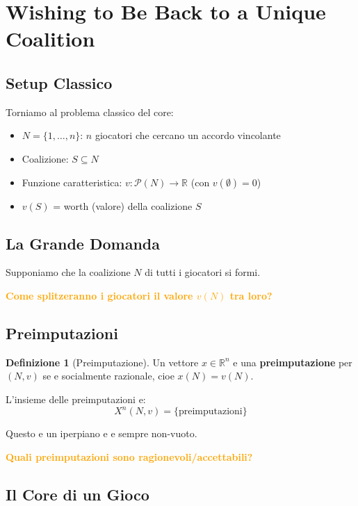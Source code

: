 \documentclass[12pt,a4paper]{article}
\theoremstyle{definition}
\newtheorem{definition}{Definizione}[section]
\begin{document}
\newpage

\section{Wishing to Be Back to a Unique Coalition}

\subsection*{Setup Classico}

Torniamo al problema classico del core:
\begin{itemize}
    \item $N = \{1, \ldots, n\}$: $n$ giocatori che cercano un accordo vincolante
    \item Coalizione: $S \subseteq N$
    \item Funzione caratteristica: $v : \mathcal{P}(N) \to \mathbb{R}$ (con $v(\emptyset) = 0$)
    \item $v(S)$ = worth (valore) della coalizione $S$
\end{itemize}

\subsection*{La Grande Domanda}

Supponiamo che la coalizione $N$ di tutti i giocatori si formi.

\textcolor{orange}{\textbf{Come splitzeranno i giocatori il valore $v(N)$ tra loro?}}

\subsection*{Preimputazioni}

\begin{definition}[Preimputazione]
Un vettore $x \in \mathbb{R}^n$ e una \textbf{preimputazione} per $(N, v)$ se e socialmente razionale, cioe $x(N) = v(N)$.
\end{definition}

L'insieme delle preimputazioni e:
\[
X^n(N, v) = \{\text{preimputazioni}\}
\]

Questo e un iperpiano e e sempre non-vuoto.

\textcolor{orange}{\textbf{Quali preimputazioni sono ragionevoli/accettabili?}}

\subsection*{Il Core di un Gioco}
\end{document}

